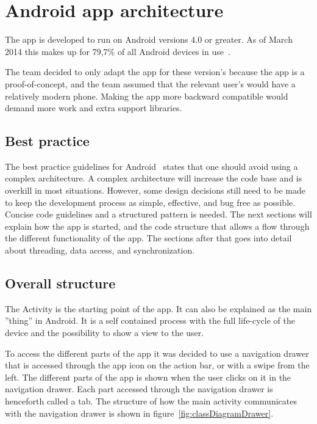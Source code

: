 \section{Android app architecture}
\label{sec:arch_app}
The app is developed to run on Android versions 4.0 or greater. As of March 2014 this makes up for 79,7\% of all Android devices in use~\cite{AndroidDeviceFragmentation}.

The team decided to only adapt the app for these version's because the app is a proof-of-concept, and the team assumed that the relevant user's would have a relatively modern phone. Making the app more backward compatible would demand more work and extra support libraries. 
%
%
\subsection{Best practice}

The best practice guidelines for Android~\cite{androidPracticePerformance} states that one should avoid using a complex architecture. A complex architecture will increase the code base and is overkill in most situations. However, some design decisions still need to be made to keep the development process as simple, effective, and bug free as possible. Concise code guidelines and a structured pattern is needed. The next sections will explain how the app is started, and the code structure that allows a flow through the different functionality of the app. The sections after that goes into detail about threading, data access, and synchronization.

\subsection{Overall structure}

The Activity is the starting point of the app. It can also be explained as the main ''thing'' in Android. It is a self contained process with the full life-cycle of the device and the possibility to show a view to the user.

To access the different parts of the app it was decided to use a navigation drawer that is accessed through the app icon on the action bar, or with a swipe from the left. The different parts of the app is shown when the user clicks on it in the navigation drawer. Each part accessed through the navigation drawer is henceforth called a tab. The structure of how the main activity communicates with the navigation drawer is shown in figure~\ref{fig:classDiagramDrawer}.

